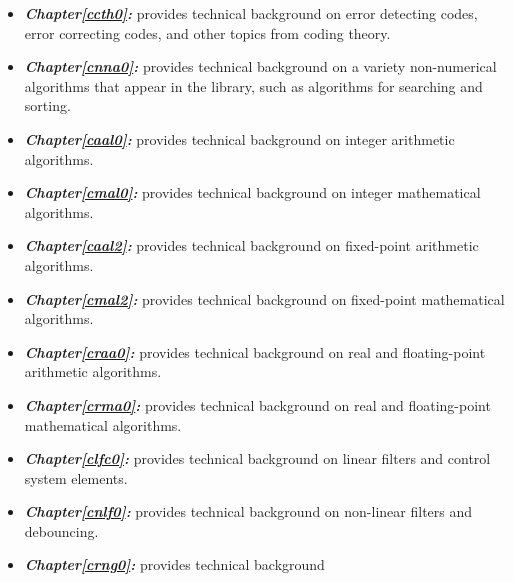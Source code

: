 \begin{itemize}
\item \emph{\textbf{Chapter\postchapterwordnonstretchable{}\ref{ccth0}: 
      \ccthzerolongtitlenoemph{}}} provides technical background on error detecting codes, 
      error correcting codes, and other topics from coding theory.  
\item \emph{\textbf{Chapter\postchapterwordnonstretchable{}\ref{cnna0}: 
      \cnnazerolongtitlenoemph{}}} provides technical background on a variety 
      non-numerical algorithms that appear in the library, such as algorithms 
      for searching and sorting.  
\item \emph{\textbf{Chapter\postchapterwordnonstretchable{}\ref{caal0}: 
      \caalzerolongtitlenoemph{}}} provides technical 
      background on integer arithmetic algorithms.  
\item \emph{\textbf{Chapter\postchapterwordnonstretchable{}\ref{cmal0}: 
      \cmalzerolongtitlenoemph{}}} provides technical 
      background on integer mathematical algorithms.  
\item \emph{\textbf{Chapter\postchapterwordnonstretchable{}\ref{caal2}: 
      \caaltwolongtitlenoemph{}}} provides technical 
      background on fixed-point arithmetic algorithms.  
\item \emph{\textbf{Chapter\postchapterwordnonstretchable{}\ref{cmal2}: 
      \cmaltwolongtitlenoemph{}}} provides 
      technical background on fixed-point mathematical algorithms.  
\item \emph{\textbf{Chapter\postchapterwordnonstretchable{}\ref{craa0}: 
      \craazerolongtitlenoemph{}}} 
      provides technical background on real and floating-point arithmetic 
      algorithms.  
\item \emph{\textbf{Chapter\postchapterwordnonstretchable{}\ref{crma0}: 
      \crmazerolongtitlenoemph{}}} 
      provides technical background on real and floating-point mathematical 
      algorithms.  
\item \emph{\textbf{Chapter\postchapterwordnonstretchable{}\ref{clfc0}: 
      \clfczerolongtitlenoemph{}}} provides technical background 
      on linear filters and control system elements.  
\item \emph{\textbf{Chapter\postchapterwordnonstretchable{}\ref{cnlf0}: 
      \cnlfzerolongtitlenoemph{}}} provides technical background on 
      non-linear filters and debouncing.  
\item \emph{\textbf{Chapter\postchapterwordnonstretchable{}\ref{crng0}: 
      \crngzerolongtitlenoemph{}}} provides technical background 

\end{itemize}
